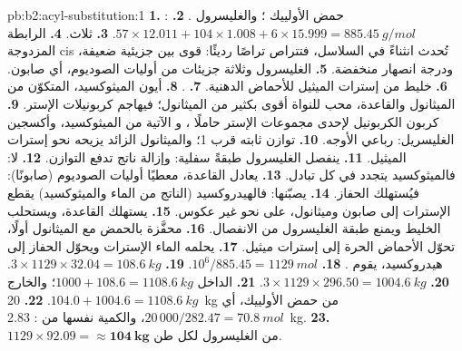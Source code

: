 \begin{solution}{pb:b2:acyl-substitution:1}
\textbf{1.} حمض الأولييك ؛ والغليسرول .
\textbf{2.} : $57 \times 12.011 + 104 \times 1.008 + 6 \times 15.999 = \qty{885.45}{g/mol}$.
\textbf{3.} ثلاث.
\textbf{4.} الرابطة المزدوجة cis تُحدث انثناءً في السلاسل، فتتراص تراصًا رديئًا: قوى بين جزيئية ضعيفة، 
ودرجة انصهار منخفضة.
\textbf{5.} الغليسرول وثلاثة جزيئات من أوليات الصوديوم، أي صابون.
\textbf{6.} خليط من إسترات الميثيل للأحماض الدهنية.
\textbf{7.} .
\textbf{8.} أيون الميثوكسيد، المتكوّن من الميثانول والقاعدة، محب للنواة أقوى بكثير من
الميثانول؛ فيهاجم كربونيلات الإستر.
\textbf{9.} كربون الكربونيل لإحدى مجموعات الإستر حاملًا ، و الآتية من الميثوكسيد، 
وأكسجين الغليسريل: رباعي الأوجه.
\textbf{10.}  توازن ثابته قرب 1؛ والميثانول الزائد يزيحه
نحو إسترات الميثيل.
\textbf{11.} ينفصل الغليسرول طبقةً سفلية: وإزالة ناتج تدفع التوازن.
\textbf{12.} لا: فالميثوكسيد يتجدد في كل تبادل.
\textbf{13.} يعادل القاعدة، معطيًا أوليات الصوديوم (صابونًا): فيُستهلك الحفاز.
\textbf{14.} يصبّنها: فالهيدروكسيد (الناتج من الماء والميثوكسيد) يقطع الإسترات إلى صابون 
وميثانول، على نحو غير عكوس.
\textbf{15.} يستهلك القاعدة، ويستحلب الخليط ويمنع طبقة الغليسرول من الانفصال.
\textbf{16.}  محفَّزة بالحمض مع الميثانول أولًا، تحوّل الأحماض الحرة إلى
إسترات ميثيل.
\textbf{17.} يحلمه الماء الإسترات ويحوّل الحفاز إلى هيدروكسيد، يقوم .
\textbf{18.} $10^6/885.45 = \qty{1129}{mol}$.
\textbf{19.} $3 \times 1129 \times 32.04 = \qty{108.6}{kg}$.
\textbf{20.} $3 \times 1129 \times 296.50 = \qty{1004.6}{kg}$.
\textbf{21.} الداخل $1000 + 108.6 = \qty{1108.6}{kg}$؛ والخارج $104.0 + 1004.6 = \qty{1108.6}{kg}$.
\textbf{22.} \qty{20}{kg} من حمض الأولييك، أي $20\,000/282.47 = \qty{70.8}{mol}$، والكمية نفسها من :
\qty{2.83}{kg}.
\textbf{23.} $1129 \times 92.09 = \boldsymbol{\approx \qty{104}{kg}}$ من الغليسرول لكل طن.
\end{solution}
